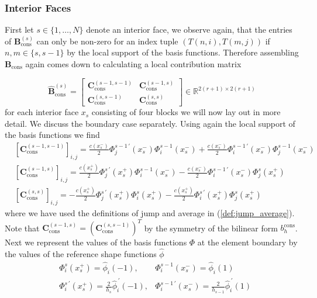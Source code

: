 \subsubsection{Interior Faces}
First let $s \in \{1,\ldots,N\}$ denote an interior face, we observe again, that the entries of
$\textbf{B}_{\text{cons}}^{(s)}$ can only be non-zero for an index tuple $(T(n,i),T(m,j))$ if
$n,m \in \{s, s-1\}$ by the local support of the basis functions.
Therefore assembling $ \textbf{B}_{\text{cons}}$ again comes down to calculating a local contribution matrix

\begin{equation*}
	\widehat{\textbf{B}}_{\text{cons}}^{(s)} =
	\begin{bmatrix}
		\textbf{C}_{\text{cons}}^{(s-1,s-1)} & \textbf{C}_{\text{cons}}^{(s-1,s)} \\
		\textbf{C}_{\text{cons}}^{(s,s-1)}   & \textbf{C}_{\text{cons}}^{(s,s)}
	\end{bmatrix}
	\in \mathbb{R}^{2(r+1) \times 2(r+1)}
\end{equation*}
for each interior face $x_s$ consisting of four blocks we will now lay out in more detail.
We discuss the boundary case separately.
Using again the local support of the basis functions we find
\begin{align*}
	 & [\textbf{C}_{\text{cons}}^{(s-1,s-1)}]_{i,j} = \frac{c(x_s^-)}{2} \Phi_j^{s-1\, \prime}(x_s^-) \Phi_i^{s-1}(x_s^-) + \frac{c(x_s^-)}{2} \Phi_i^{s-1\, \prime}(x_s^-) \Phi_j^{s-1}(x_s^-) \\
	 & [\textbf{C}_{\text{cons}}^{(s-1,s)}]_{i,j} = \frac{c(x_s^+)}{2} \Phi_j^{s\, \prime}(x_s^+) \Phi_i^{s-1}(x_s^-) - \frac{c(x_s^-)}{2} \Phi_i^{s-1\, \prime}(x_s^-) \Phi_j^{s}(x_s^+)       \\
	 & [\textbf{C}_{\text{cons}}^{(s,s)}]_{i,j} = -\frac{c(x_s^+)}{2} \Phi_j^{s\, \prime}(x_s^+) \Phi_i^{s}(x_s^+) - \frac{c(x_s^+)}{2} \Phi_i^{s\, \prime}(x_s^+) \Phi_j^{s}(x_s^+)
\end{align*}
where we have used the definitions of jump and average in (\ref{def:jump_average}).
Note that $ \textbf{C}_{\text{cons}}^{(s-1,s)} = (\textbf{C}_{\text{cons}}^{(s,s-1)})^T$ by the symmetry of the bilinear form $b_h^{\text{cons}}$.
Next we represent the values of the basis functions $ \Phi $ at the element boundary by the values of the reference
shape functions $\widehat{\phi}$
\begin{align}
	 & \Phi_i^s(x_s^+) = \widehat{\phi}_i(-1) ,                                                   & \Phi^{s-1}_i(x_s^-) = \widehat{\phi}_i(1) \label{eq:shape_fun_and_basis_fun_values_equality} \\
	 & \Phi_i^{s\, \prime }(x_s^+) = \frac{2}{h_{s}} \widehat{\phi}_i^{\,\prime}(-1),
	 & \Phi_i^{s-1\, \prime }(x_s^-) = \frac{2}{h_{s-1}} \widehat{\phi}_i^{\,\prime}(1) \nonumber
\end{align}
